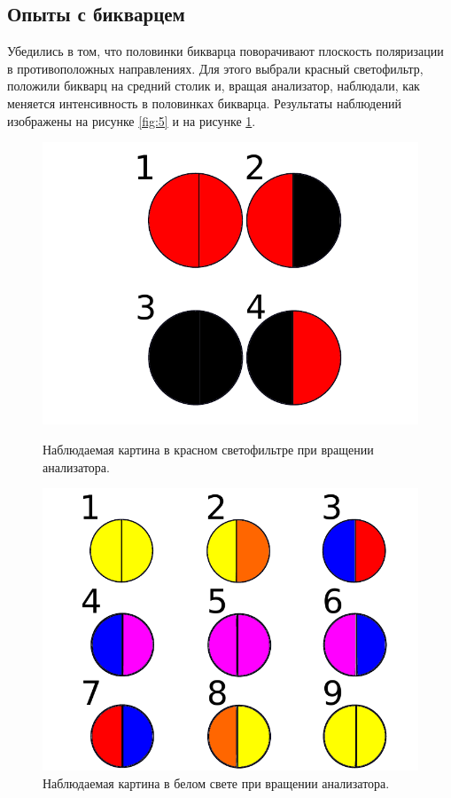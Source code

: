 \documentclass[12pt]{article}
\begin{document}
	\subsection{Опыты с бикварцем}
	Убедились в том, что половинки бикварца поворачивают плоскость поляризации в противоположных направлениях. Для этого выбрали красный светофильтр, положили бикварц на средний столик и, вращая анализатор, наблюдали, как меняется интенсивность в половинках бикварца. Результаты наблюдений изображены на рисунке \ref{fig:5} и на рисунке \ref{fig:6}.
	\begin{figure}[tb]
	  	\begin{center}
		\begin{minipage}[h]{0.45\linewidth}
		\includegraphics[width=1\linewidth]{../images/bi}
		\caption{Наблюдаемая картина в красном светофильтре при вращении анализатора.} 
		\label{fig:5}
		\end{minipage}
		\hfill
		\begin{minipage}[h]{0.45\linewidth}
		\includegraphics[width=1\linewidth]{../images/bi2}
		\caption{Наблюдаемая картина в белом свете при вращении анализатора.}
		\label{fig:6}
		\end{minipage}
		\end{center}
	\end{figure}
\end{document}
